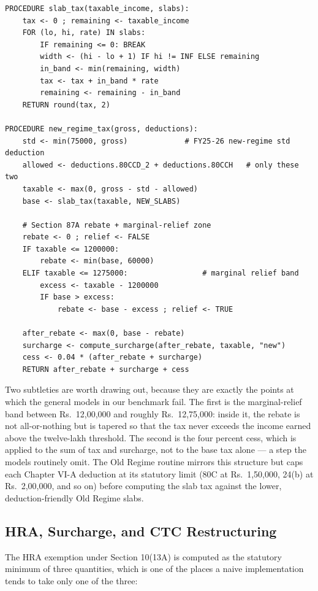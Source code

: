 \begin{lstlisting}[style=pseudo]
PROCEDURE slab_tax(taxable_income, slabs):
    tax <- 0 ; remaining <- taxable_income
    FOR (lo, hi, rate) IN slabs:
        IF remaining <= 0: BREAK
        width <- (hi - lo + 1) IF hi != INF ELSE remaining
        in_band <- min(remaining, width)
        tax <- tax + in_band * rate
        remaining <- remaining - in_band
    RETURN round(tax, 2)

PROCEDURE new_regime_tax(gross, deductions):
    std <- min(75000, gross)             # FY25-26 new-regime std deduction
    allowed <- deductions.80CCD_2 + deductions.80CCH   # only these two
    taxable <- max(0, gross - std - allowed)
    base <- slab_tax(taxable, NEW_SLABS)

    # Section 87A rebate + marginal-relief zone
    rebate <- 0 ; relief <- FALSE
    IF taxable <= 1200000:
        rebate <- min(base, 60000)
    ELIF taxable <= 1275000:                 # marginal relief band
        excess <- taxable - 1200000
        IF base > excess:
            rebate <- base - excess ; relief <- TRUE

    after_rebate <- max(0, base - rebate)
    surcharge <- compute_surcharge(after_rebate, taxable, "new")
    cess <- 0.04 * (after_rebate + surcharge)
    RETURN after_rebate + surcharge + cess
\end{lstlisting}

Two subtleties are worth drawing out, because they are exactly the points at
which the general models in our benchmark fail. The first is the marginal-relief
band between Rs.~12,00,000 and roughly Rs.~12,75,000: inside it, the rebate is
not all-or-nothing but is tapered so that the tax never exceeds the income earned
above the twelve-lakh threshold. The second is the four percent cess, which is
applied to the sum of tax and surcharge, not to the base tax alone --- a step
the models routinely omit. The Old Regime routine mirrors this structure but
caps each Chapter VI-A deduction at its statutory limit (80C at Rs.~1,50,000,
24(b) at Rs.~2,00,000, and so on) before computing the slab tax against the
lower, deduction-friendly Old Regime slabs.

\subsection{HRA, Surcharge, and CTC Restructuring}
The HRA exemption under Section 10(13A) is computed as the statutory minimum of
three quantities, which is one of the places a naive implementation tends to
take only one of the three:


